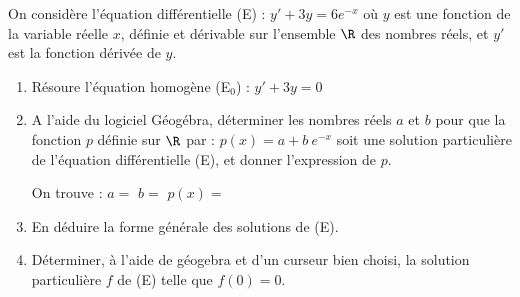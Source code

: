 On considère l’équation différentielle (E) : $y' + 3y = 6e^{-x}$ où $y$ est une fonction de la variable réelle $x$, définie et dérivable sur l’ensemble $\R$ des nombres réels, et $y'$ est la fonction dérivée de $y$.

\begin{enumerate}
	\item Résoure l'équation homogène (E$_0$) : $y'+3y=0$\sautp

	\item A l’aide du logiciel Géogébra, déterminer les nombres réels $a$ et $b$ pour que la fonction $p$ définie sur $\R$ par : $p(x) = a + b~e^{- x}$ soit une solution particulière de l'équation différentielle (E), et donner l’expression de $p$. \sautm
	
	On trouve : $a=$\makebox[0.1\linewidth]{\dotfill} \hfill $b=$\makebox[0.1\linewidth]{\dotfill} \hfill $p(x)=$\makebox[0.3\linewidth]{\dotfill}\sauts
	\item En déduire la forme générale des solutions de (E).\sautp

	\item Déterminer, à l'aide de géogebra et d'un curseur bien choisi, la solution particulière $f$ de (E) telle que $f(0)=0$.\sautp

\end{enumerate}